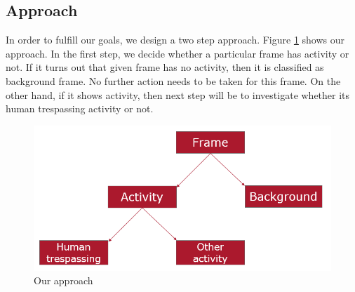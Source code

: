 \subsection{Approach}
\label{sec:approach}
In order to fulfill our goals, we design a two step approach. Figure \ref{fig:trespassing-detection-framework} shows our approach.  In the first step, we decide whether a particular frame has activity or not. If it turns out that given frame has no activity, then it is classified as background frame. No further action needs to be taken for this frame. On the other hand, if it shows activity, then next step will be to investigate whether its human trespassing activity or not.

\begin{figure}
    \centering
    \includegraphics[width=\linewidth]{images/trespassing-detection-framework.PNG}
    \caption{Our approach}
    \label{fig:trespassing-detection-framework}
\end{figure}



\newpage